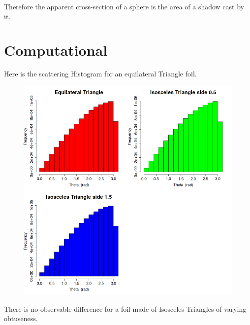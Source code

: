 \documentclass[12pt]{article}
\begin{document}
Therefore the apparent cross-section of a sphere is the area of a shadow cast by it.

\pagebreak
\section{Computational}

Here is the scattering Histogram for an equilateral Triangle foil.

\begin{figure}[h]
  \centering
  \includegraphics[width=400pt]{comp/hist.png}
  \label{fig:hist}
\end{figure}

There is no observable difference for a foil made of Isosceles Triangles of varying obtuseness.
\end{document}
